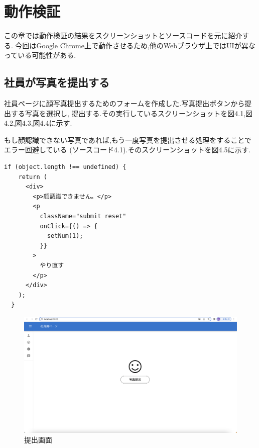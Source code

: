 \chapter{動作検証}
\label{chp:tex_pro}
この章では動作検証の結果をスクリーンショットとソースコードを元に紹介する.
今回はGoogle Chrome上で動作させるため,他のWebブラウザ上ではUIが異なっている可能性がある.

\section{社員が写真を提出する}
\label{sec:tex_pro_cmd}
社員ページに顔写真提出するためのフォームを作成した.写真提出ボタンから提出する写真を選択し,
提出する.その実行しているスクリーンショットを図4.1,図4.2,図4.3,図4.4に示す.

もし顔認識できない写真であれば,もう一度写真を提出させる処理をすることでエラー回避している
(ソースコード4.1).そのスクリーンショットを図4.5に示す.

\begin{lstlisting}[caption=顔認識エラー処理]
  if (object.length !== undefined) {
    return (
      <div>
        <p>顔認識できません。</p>
        <p
          className="submit reset"
          onClick={() => {
            setNum(1);
          }}
        >
          やり直す
        </p>
      </div>
    );
  }
\end{lstlisting}

\vspace{4mm}

\begin{figure}[!h]
	\begin{center}
			\includegraphics[scale=0.3, clip]{./img/sample1.png}
			\caption{提出画面}
			\label{fig:図の名前}
	\end{center}
\end{figure}

